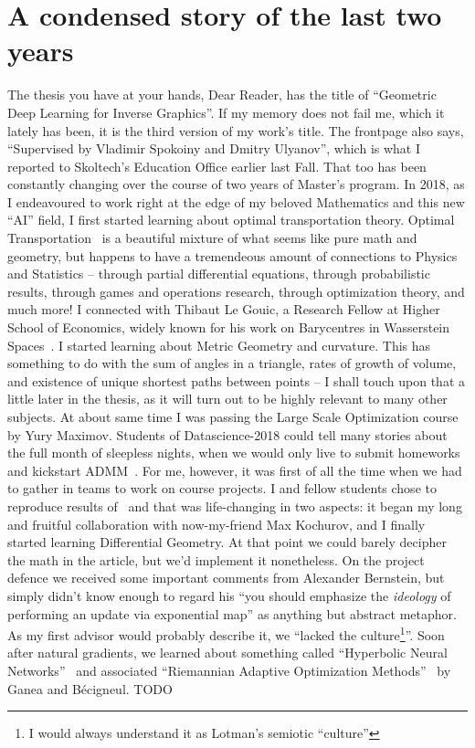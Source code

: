 \section*{A condensed story of the last two years}

The thesis you have at your hands, Dear Reader, has the title of ``Geometric
Deep Learning for Inverse Graphics''. If my memory does not fail me, which it
lately has been, it is the third version of my work's title. The frontpage also
says, ``Supervised by Vladimir Spokoiny and Dmitry Ulyanov'', which is what I
reported to Skoltech's Education Office earlier last Fall. That too has been
constantly changing over the course of two years of Master's program.  In 2018,
as I endeavoured to work right at the edge of my beloved Mathematics and this
new ``AI'' field, I first started learning about optimal transportation theory.
Optimal Transportation~\citep{villaniOldNew,ambrosioOTSummerSchool} is a
beautiful mixture of what seems like pure math and geometry, but happens to
have a tremendeous amount of connections to Physics and Statistics -- through
partial differential equations, through probabilistic results, through games
and operations research, through optimization theory, and much more! I
connected with Thibaut Le Gouic, a Research Fellow at Higher School of
Economics, widely known for his work on Barycentres in Wasserstein
Spaces~\citep{le2017existence}. I started learning about Metric Geometry and
curvature. This has something to do with the sum of angles in a triangle, rates
of growth of volume, and existence of unique shortest paths between points -- I
shall touch upon that a little later in the thesis, as it will turn out to be
highly relevant to many other subjects. At about same time I was passing the
Large Scale Optimization course by Yury Maximov. Students of Datascience-2018
could tell many stories about the full month of sleepless nights, when we would
only live to submit homeworks and kickstart ADMM~\citep{admmTweet,admmBoyd}.
For me, however, it was first of all the time when we had to gather in teams to work
on course projects. I and fellow students chose to reproduce results
of~\citet{acceleratingNatgrad} and that was life-changing in two aspects: it
began my long and fruitful collaboration with now-my-friend Max Kochurov, and I
finally started learning Differential Geometry. At that point we could barely
decipher the math in the article, but we'd implement it nonetheless. On the project
defence we received some important comments from Alexander Bernstein, but simply
didn't know enough to regard his ``you should emphasize the \emph{ideology}
of performing an update via exponential map'' as anything but abstract
metaphor.  As my first advisor would probably describe it, we ``lacked the
culture\footnote{I would always understand it as Lotman's semiotic
``culture''}''.  Soon after natural gradients, we learned about something called
``Hyperbolic Neural Networks''~\citep{ganeaHNNs} and associated ``Riemannian
Adaptive Optimization Methods''~\citep{riemAdaptive} by Ganea and B\'ecigneul.
TODO

